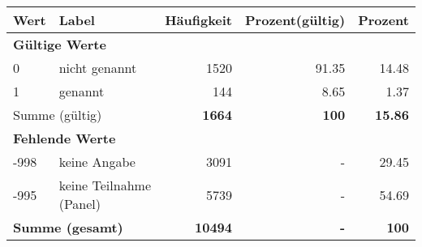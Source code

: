      \begin{longtable}{lXrrr}
     \toprule
     \textbf{Wert} & \textbf{Label} & \textbf{Häufigkeit} & \textbf{Prozent(gültig)} & \textbf{Prozent} \\
     \endhead
     \midrule
     \multicolumn{5}{l}{\textbf{Gültige Werte}}\\

     0 &
     \multicolumn{1}{X}{ nicht genannt   } &


       \num{1520} &
       \num[round-mode=places,round-precision=2]{91,35} &
         \num[round-mode=places,round-precision=2]{14,48} \\

     1 &
     \multicolumn{1}{X}{ genannt   } &


       \num{144} &
       \num[round-mode=places,round-precision=2]{8,65} &
         \num[round-mode=places,round-precision=2]{1,37} \\
     \midrule
     \multicolumn{2}{l}{Summe (gültig)} &
       \textbf{\num{1664}} &
     \textbf{100} &
       \textbf{\num[round-mode=places,round-precision=2]{15,86}} \\
     \multicolumn{5}{l}{\textbf{Fehlende Werte}}\\
       -998 &
       keine Angabe &
         \num{3091} &
        - &
         \num[round-mode=places,round-precision=2]{29,45} \\
       -995 &
       keine Teilnahme (Panel) &
         \num{5739} &
        - &
         \num[round-mode=places,round-precision=2]{54,69} \\
     \midrule
     \multicolumn{2}{l}{\textbf{Summe (gesamt)}} &
          \textbf{\num{10494}} &
        \textbf{-} &
        \textbf{100} \\
     \bottomrule
     \end{longtable}
     
